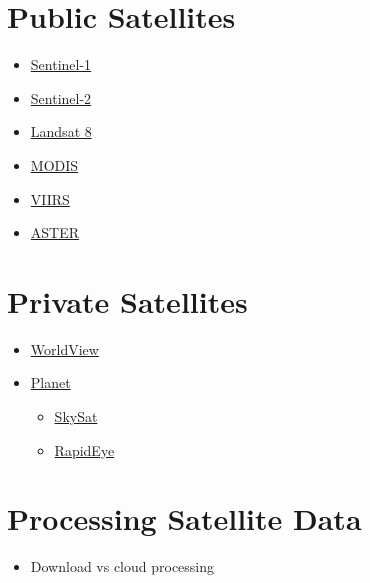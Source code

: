 \documentclass[
  letterpaper,
  DIV=11,
  numbers=noendperiod]{scrreprt}
\providecommand{\tightlist}{%
  \setlength{\itemsep}{0pt}\setlength{\parskip}{0pt}}\usepackage{longtable,booktabs,array}
\begin{document}
\hypertarget{public-satellites}{%
\chapter{Public Satellites}\label{public-satellites}}

\begin{itemize}
\tightlist
\item
  \href{https://sentinel.esa.int/web/sentinel/missions/sentinel-1}{Sentinel-1}
\item
  \href{https://sentinel.esa.int/web/sentinel/missions/sentinel-2}{Sentinel-2}
\item
  \href{https://www.usgs.gov/land-resources/nli/landsat/landsat-8}{Landsat
  8}
\item
  \href{https://modis.gsfc.nasa.gov/}{MODIS}
\item
  \href{https://www.ngdc.noaa.gov/eog/viirs/download_dnb_composites.html}{VIIRS}
\item
  \href{https://asterweb.jpl.nasa.gov/}{ASTER}
\end{itemize}

\hypertarget{private-satellites}{%
\chapter{Private Satellites}\label{private-satellites}}

\begin{itemize}
\tightlist
\item
  \href{https://www.maxar.com/products/satellite-imagery/worldview}{WorldView}
\item
  \href{https://www.planet.com/}{Planet}

  \begin{itemize}
  \tightlist
  \item
    \href{https://www.planet.com/products/skysat-imagery/}{SkySat}
  \item
    \href{https://www.planet.com/products/rapideye/}{RapidEye}
  \end{itemize}
\end{itemize}

\hypertarget{processing-satellite-data}{%
\chapter{Processing Satellite Data}\label{processing-satellite-data}}

\begin{itemize}
\tightlist
\item
  Download vs cloud processing
\end{itemize}
\end{document}
